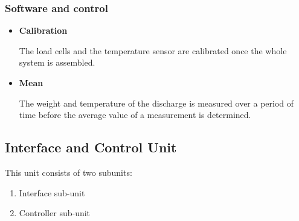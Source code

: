 \subsubsection{Software and control}
\begin{itemize}
    \item \textbf{Calibration}
    \par
    The load cells and the temperature sensor are calibrated once the whole system is assembled.
   
    \item \textbf{Mean}
    \par
     The weight and temperature of the discharge is measured over a period of time before the average value of a measurement is determined. 
\end{itemize}

\subsection{Interface and Control Unit}
This unit consists of two subunits:
\begin{enumerate}
    \item Interface sub-unit
    \item Controller sub-unit
\end{enumerate}

